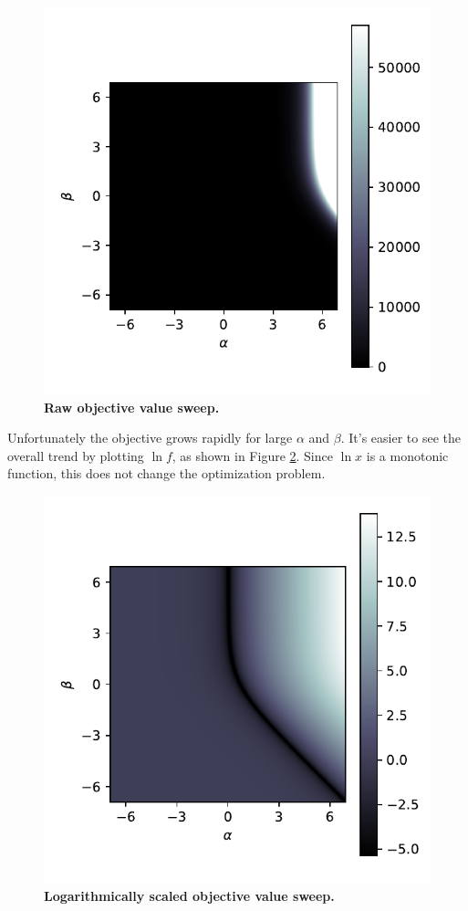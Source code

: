 \documentclass{article}
\begin{document}
\begin{figure}[!ht]
\centering
\includegraphics{figure1-raw_objective_values}
\caption{\textbf{Raw objective value sweep.}}
\label{figure:objective}
\end{figure}

Unfortunately the objective grows rapidly for large \(\alpha\) and \(\beta\).  It's easier to see the overall trend by plotting \(\ln f\), as shown in Figure \ref{figure:log-objective}.  Since \(\ln x\) is a monotonic function, this does not change the optimization problem.

\begin{figure}[!ht]
\centering
\includegraphics{figure2-log_objective_values}
\caption{\textbf{Logarithmically scaled objective value sweep.}}
\label{figure:log-objective}
\end{figure}
\end{document}
